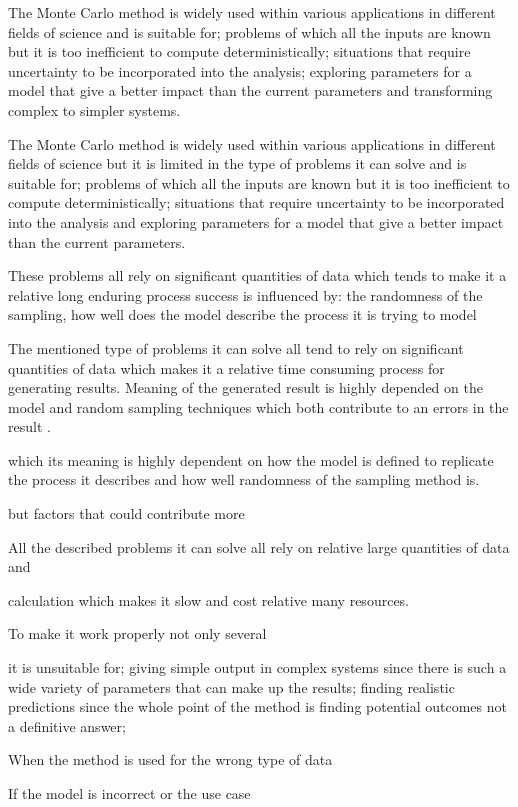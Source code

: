 The Monte Carlo method is widely used within various applications in different fields of science and is suitable for; problems of which all the inputs are known but it is too inefficient to compute deterministically; situations that require uncertainty to be incorporated into the analysis; exploring parameters for a model that give a better impact than the current parameters and transforming complex to simpler systems. 

The Monte Carlo method is widely used within various applications in different fields of science but it is limited in the type of problems it can solve and is suitable for; problems of which all the inputs are known but it is too inefficient to compute deterministically; situations that require uncertainty to be incorporated into the analysis and exploring parameters for a model that give a better impact than the current parameters. 

These problems all rely on significant quantities of data which tends to make it a relative long enduring process success is influenced by: the randomness of the sampling, how well does the model describe the process it is trying to model 

The mentioned type of problems it can solve all tend to rely on significant quantities of data which makes it a relative time consuming process for generating results. Meaning of the generated result is highly depended on the model and random sampling techniques which both contribute to an errors in the result .

 which its meaning is highly dependent on how the model is defined to replicate the process it describes and how well randomness of the sampling method is.

 but factors that could contribute more 

All the described problems it can solve all rely on relative large quantities of data and 

calculation which makes it slow and cost relative many resources.  


To make it work properly not only several 


it is unsuitable for; giving simple output in complex systems since there is such a wide variety of parameters that can make up the results; finding realistic predictions since the whole point of the method is finding potential outcomes not a definitive answer;

When the method is used for the wrong type of data

If the model is incorrect or the use case 

